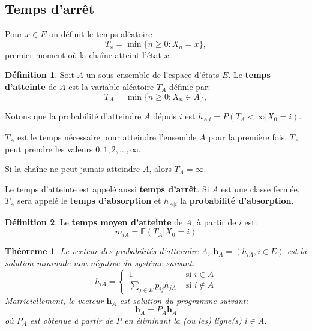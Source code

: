 \documentclass[
]{book}
\newtheorem{theorem}{Théoreme}[chapter]
\theoremstyle{definition}
\newtheorem{definition}{Définition}[chapter]
\theoremstyle{definition}
\theoremstyle{definition}
\theoremstyle{remark}
\begin{document}
\hypertarget{temps-darruxeat}{%
\subsection{Temps d'arrêt}\label{temps-darruxeat}}

Pour \(x \in E\) on définit le temps aléatoire
\[
T_x = \min\{n \geq 0 : X_n = x\},
\]
premier moment où la chaîne atteint l'état \(x\).

\begin{definition}
\protect\hypertarget{def:unnamed-chunk-67}{}{\label{def:unnamed-chunk-67} }Soit \(A\) un sous ensemble de l'espace d'états \(E\). Le \textbf{temps d'atteinte} de \(A\) est la variable aléatoire \(T_A\) définie par:
\[
T_A = \min\{n \geq 0 : X_n \in A \},
\]
\end{definition}

Notons que la probabilité d'atteindre \(A\) dépuis \(i\) est \(h_{A|i} = P(T_A < \infty |X_0 = i)\).

\(T_A\) est le temps nécessaire pour atteindre l'ensemble \(A\) pour la première fois. \(T_A\) peut prendre les valeurs \(0,1,2,\ldots , \infty\).

Si la chaîne ne peut jamais atteindre \(A\), alors \(T_A= \infty\).

Le temps d'atteinte est appelé aussi \textbf{temps d'arrêt}. Si \(A\) est une classe fermée, \(T_A\) sera appelé le \textbf{temps d'absorption} et \(h_{A|i}\) la \textbf{probabilité d'absorption}.

\begin{definition}
\protect\hypertarget{def:unnamed-chunk-68}{}{\label{def:unnamed-chunk-68} }Le \textbf{temps moyen d'atteinte} de \(A\), à partir de \(i\) est:
\[ m_{iA}=\mathbb{E}\left(T_A | X_0=i \right)\]
\end{definition}

\begin{theorem}
\protect\hypertarget{thm:unnamed-chunk-69}{}{\label{thm:unnamed-chunk-69} }Le vecteur des probabilités d'atteindre \(A\), \(\mathbf{h}_A=(h_{iA}, i \in E)\) est la solution minimale non négative du système suivant:
\[
h_{iA}=\left\{
\begin{array}{ll}
1 & \text{ si } i \in A\\
\displaystyle \sum_{j \in E}p_{ij}h_{jA} & \text{ si } i \notin A
\end{array}
\right.
\]
Matriciellement, le vecteur \(\mathbf{h}_A\) est solution du programme suivant:
\[
\mathbf{h}_A = P_A \mathbf{h}_A
\]
où \(P_A\) est obtenue à partir de \(P\) en éliminant la (ou les) ligne(s) \(i \in A\).
\end{theorem}
\end{document}
